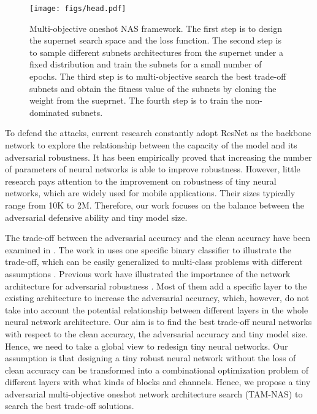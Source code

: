 \documentclass[journal]{IEEEtran}
\newcommand{\revised}[1]{{\color{black} #1}}
\begin{document}
\begin{figure}[t]
    \centering
    \texttt{[image: figs/head.pdf]}
    \caption{Multi-objective oneshot NAS framework. The first step is to design the supernet search space and the loss function. The second step is to sample different subnets architectures from the supernet under a fixed distribution and train the subnets for a small number of epochs. The third step is to multi-objective search the best trade-off subnets and obtain the fitness value of the subnets by cloning the weight from the sueprnet. The fourth step is to train the non-dominated subnets.}
    \label{fig:easy_framework}
\end{figure}


To defend the attacks, current research \cite{madry:madry2017towards, cubuk:cubuk2017intriguing, afs} constantly adopt ResNet \cite{he:he2016deep} as the backbone network to \revised{explore the relationship between the capacity of the model and its adversarial robustness.} \revised{It has been empirically proved that increasing the number of parameters of neural networks is able to improve robustness}. However, little research pays attention to the improvement on robustness of tiny neural networks, which are widely used for mobile applications. Their sizes typically range from 10K to 2M. Therefore, our work focuses on the balance between the adversarial defensive ability and tiny model size.

The trade-off between the adversarial accuracy and the clean accuracy have been examined in \cite{tsipras:tsipras2018robustness}. The work in \cite{tsipras:tsipras2018robustness} uses one specific binary classifier to illustrate the trade-off, which can be easily generalized to multi-class problems with different assumptions \cite{zhang:zhang2019theoretically}. Previous work have illustrated the importance of the network architecture for adversarial robustness \cite{madry:madry2017towards, cubuk:cubuk2017intriguing}. Most of them add a specific layer to the existing architecture to increase the adversarial accuracy, which, however, do not take into account the potential relationship between different layers in the whole neural network architecture. Our aim is to find the best trade-off neural networks with respect to the clean accuracy, the adversarial accuracy and tiny model size. Hence, we need to take a global view to redesign tiny neural networks. Our assumption is that designing a tiny robust neural network without the loss of clean accuracy can be transformed into a combinational optimization problem of different layers with what kinds of blocks and channels. Hence, we propose a tiny adversarial multi-objective oneshot network architecture search (TAM-NAS) to search the best trade-off solutions.   
\end{document}
